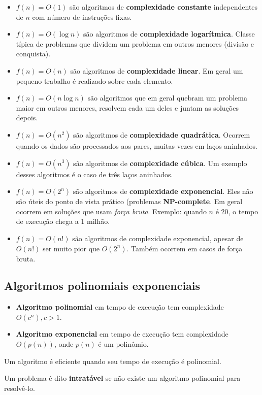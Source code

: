 \begin{itemize}
\item $f(n) = O(1)$ são algoritmos de {\bf complexidade constante}
independentes de $n$ com número de instruções fixas.

\item $f(n) = O(\log n)$ são algoritmos de {\bf complexidade logarítmica}.
Classe típica de problemas que dividem um problema em outros menores (divisão e conquista).

\item $f(n) = O(n)$ são algoritmos de {\bf complexidade linear}. Em geral 
um pequeno trabalho é realizado sobre cada elemento.

\item $f(n) = O(n \log n)$ são algoritmos que em geral quebram um problema maior em outros
menores, resolvem cada um deles e juntam as soluções depois.

\item $f(n) = O(n^2)$ são algoritmos de {\bf complexidade quadrática}. 
Ocorrem quando os dados são processados aos pares, muitas vezes em laços aninhados.

\item $f(n) = O(n^3)$ são algoritmos de \textbf{complexidade cúbica}. Um exemplo
desses algoritmos é o caso de três laços aninhados.

\item $f(n) = O(2^n)$ são algoritmos de \textbf{complexidade exponencial}. Eles
não são úteis do ponto de vista prático (problemas \textbf{NP-complete}.
Em geral ocorrem em soluções que usam \textit{força bruta}. Exemplo: quando $n$ é 20,
o tempo de execução chega a $1$ milhão.

\item $f(n) = O(n!)$ são algoritmos de complexidade exponencial, apesar
de $O(n!)$ ser muito pior que $O(2^n)$. Também ocorrem em casos de força bruta.
\end{itemize}

\subsection{Algoritmos polinomiais exponenciais}

\begin{itemize}
\item {\bf Algoritmo polinomial} em tempo de execução tem complexidade $O(c^n), c > 1$.
\item {\bf Algoritmo exponencial} em tempo de execução tem complexidade $O(p(n))$, onde
$p(n)$ é um polinômio.
\end{itemize}


\begin{framed}
\centering
Um algoritmo é eficiente quando seu tempo de execução é polinomial.
\end{framed}

Um problema é dito \textbf{intratável} se não existe um algoritmo polinomial para resolvê-lo.
